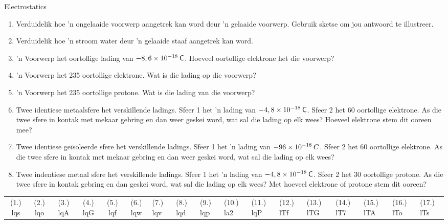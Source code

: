 \begin{eocexercises}{Electrostatics}
\begin{enumerate}[itemsep=5pt, label=\textbf{\arabic*}. ]
\item Verduidelik hoe 'n ongelaaide voorwerp aangetrek kan word deur 'n gelaaide voorwerp. Gebruik sketse om jou antwoord te illustreer. 

\item Verduidelik hoe 'n stroom water deur 'n gelaaide staaf aangetrek kan word.

\item 'n Voorwerp het oortollige lading van $-8,6\ensuremath{\times}{10}^{-18}\phantom{\rule{2pt}{0ex}}\mathsf{C}$. Hoeveel oortollige elektrone het die voorwerp?

\item 'n Voorwerp het 235 oortollige elektrone. Wat is die lading op die voorwerp? 

\item 'n Voorwerp het 235 oortollige protone. Wat is die lading van die voorwerp?

\item Twee identiese metaalsfere het verskillende ladings. Sfeer 1 het 'n lading van $-4,8\ensuremath{\times}{10}^{-18}\phantom{\rule{2pt}{0ex}}\mathsf{C}$. Sfeer 2 het 60 oortollige elektrone. As die twee sfere in kontak met mekaar gebring en dan weer geskei word, wat sal die lading op elk wees? Hoeveel elektrone stem dit ooreen mee?

\item Twee identiese ge\"isoleerde sfere het verskillende ladings. Sfeer 1 het 'n lading van $-96\ensuremath{\times}{10}^{-18}\phantom{\rule{2pt}{0ex}}C$. Sfeer 2 het 60 oortollige elektrone. As die twee sfere in kontak met mekaar gebring en dan weer geskei word, wat sal die lading op elk wees?

\item Twee indentiese metaal sfere het verskillende ladings. Sfeer 1 het 'n lading van $-4,8\ensuremath{\times}{10}^{-18}\phantom{\rule{2pt}{0ex}}\mathsf{C}$. Sfeer 2 het 30 oortollige protone. As die twee sfere in kontak gebring en dan geskei word, wat sal die lading op elk wees? Met hoeveel elektrone of protone stem dit ooreen?
            \end{enumerate}
  \label{m38781**end}
  \label{464e844ca5615087ea89d9d95dd9a43a**end}
\practiceinfo
\begin{tabular}[h]{cccccc}
 (1.) lqs  &  (2.) lqo  &  (3.) lqA  &  (4.) lqG  &  (5.) lqf  &  (6.) lqw  &  (7.) lqv  &  (8.) lqd  &  (9.) lqp  &  (10.) la2  &  (11.) lqP  &  (12.) lTf  &  (13.) lTG  &  (14.) lT7  &  (15.) lTA  &  (16.) lTo  &  (17.) lTs  & \end{tabular}
\end{eocexercises}
